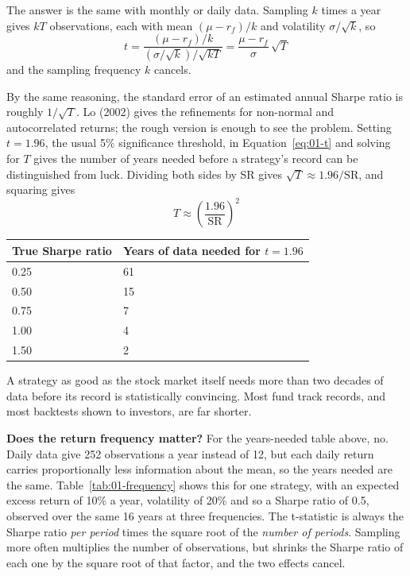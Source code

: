 The answer is the same with monthly or daily data. Sampling $k$ times a year gives $kT$ observations, each with mean $(\mu - r_f)/k$ and volatility $\sigma/\sqrt{k}$, so
\begin{equation}
  t = \frac{(\mu - r_f)/k}{(\sigma/\sqrt{k})/\sqrt{kT}} = \frac{\mu - r_f}{\sigma}\,\sqrt{T} \nonumber
\end{equation}
and the sampling frequency $k$ cancels.

By the same reasoning, the standard error of an estimated annual Sharpe ratio is roughly $1/\sqrt{T}$. Lo (2002) gives the refinements for non-normal and autocorrelated returns; the rough version is enough to see the problem. Setting $t = 1.96$, the usual 5\% significance threshold, in Equation~\eqref{eq:01-t} and solving for $T$ gives the number of years needed before a strategy's record can be distinguished from luck. Dividing both sides by SR gives $\sqrt{T} \approx 1.96/\mathrm{SR}$, and squaring gives
\begin{equation}
  T \approx \left(\frac{1.96}{\mathrm{SR}}\right)^2
  \label{eq:01-T}
\end{equation}

\begin{center}
\small
\begin{tabular}{@{}ll@{}}
\toprule
True Sharpe ratio & Years of data needed for $t = 1.96$ \\
\midrule
0.25 & 61 \\
0.50 & 15 \\
0.75 & 7 \\
1.00 & 4 \\
1.50 & 2 \\
\bottomrule
\end{tabular}
\end{center}

A strategy as good as the stock market itself needs more than two decades of data before its record is statistically convincing. Most fund track records, and most backtests shown to investors, are far shorter.

\textbf{Does the return frequency matter?} For the years-needed table above, no. Daily data give 252 observations a year instead of 12, but each daily return carries proportionally less information about the mean, so the years needed are the same. Table~\ref{tab:01-frequency} shows this for one strategy, with an expected excess return of 10\% a year, volatility of 20\% and so a Sharpe ratio of 0.5, observed over the same 16 years at three frequencies. The t-statistic is always the Sharpe ratio \emph{per period} times the square root of the \emph{number of periods}. Sampling more often multiplies the number of observations, but shrinks the Sharpe ratio of each one by the square root of that factor, and the two effects cancel.

